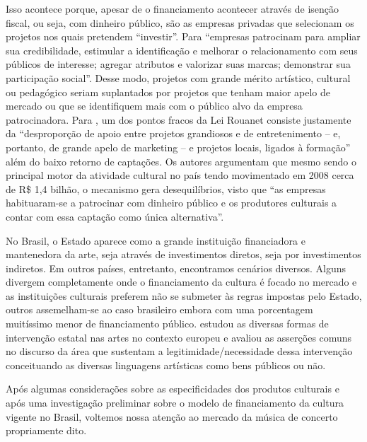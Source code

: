\documentclass[a4paper, 12pt, openright, oneside, german, french, english, brazil]{abntex2}
\begin{document}
	Isso acontece porque, apesar de o financiamento acontecer através de isenção fiscal, ou seja, com dinheiro público, são as empresas privadas que selecionam os projetos nos quais pretendem ``investir''. Para  ``empresas patrocinam para ampliar sua credibilidade, estimular a identificação e melhorar o relacionamento com seus públicos de interesse; agregar atributos e valorizar suas marcas; demonstrar sua participação social''. Desse modo, projetos com grande mérito artístico, cultural ou pedagógico seriam suplantados por projetos que tenham maior apelo de mercado ou que se identifiquem mais com o público alvo da empresa patrocinadora. Para , um dos pontos fracos da Lei Rouanet consiste justamente da ``desproporção de apoio entre projetos grandiosos e de entretenimento -- e, portanto, de grande apelo de marketing -- e projetos locais, ligados à formação'' além do baixo retorno de captações. Os autores argumentam que mesmo sendo o principal motor da atividade cultural no país tendo movimentado em 2008 cerca de R\$ 1,4 bilhão, o mecanismo gera desequilíbrios, visto que ``as empresas habituaram-se a patrocinar com dinheiro público e os produtores culturais a contar com essa captação como única alternativa''\cite[pos. 475]{weiss2009estatais}.
		
	
	No Brasil, o Estado aparece como a grande instituição financiadora e mantenedora da arte, seja através de investimentos diretos, seja por investimentos indiretos. Em outros países, entretanto, encontramos cenários diversos. Alguns divergem completamente onde o financiamento da cultura é focado no mercado e as instituições culturais preferem não se submeter às regras impostas pelo Estado, outros assemelham-se ao caso brasileiro embora com uma porcentagem muitíssimo menor de financiamento público.  estudou as diversas formas de intervenção estatal nas artes no contexto europeu e avaliou as asserções comuns no discurso da área que sustentam a legitimidade/necessidade dessa intervenção conceituando as diversas linguagens artísticas como bens públicos ou não.
	
	
	Após algumas considerações sobre as especificidades dos produtos culturais e após uma investigação preliminar sobre o modelo de financiamento da cultura vigente no Brasil, voltemos nossa atenção ao mercado da música de concerto propriamente dito.
	
		
	
	
	
	
	
\end{document}
